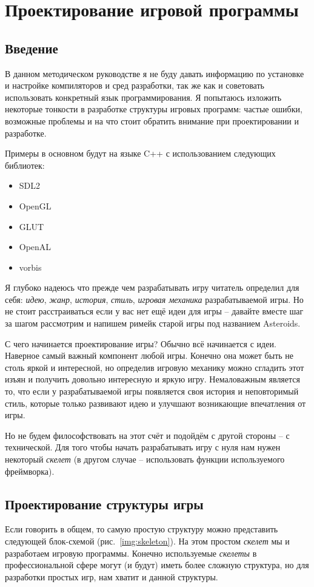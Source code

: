 \chapter{Проектирование игровой программы}
\section{Введение}

В данном методическом руководстве я не буду давать информацию по установке и настройке компиляторов и сред 
разработки, так же как и советовать использовать конкретный язык программирования. Я попытаюсь изложить 
некоторые тонкости в разработке структуры игровых программ: частые ошибки, возможные проблемы и на что стоит 
обратить внимание при проектировании и разработке.

Примеры в основном будут на языке C++ с использованием следующих библиотек:
\begin{itemize}
    \item SDL2
    \item OpenGL
    \item GLUT
    \item OpenAL
    \item vorbis
\end{itemize}

Я глубоко надеюсь что прежде чем разрабатывать игру читатель определил для себя: \emph{идею}, \emph{жанр}, 
\emph{история}, \emph{стиль}, \emph{игровая механика} разрабатываемой игры. Но не стоит расстраиваться если 
у вас нет ещё идеи для игры -- давайте вместе шаг за шагом рассмотрим и напишем римейк старой игры под 
названием Asteroids.

С чего начинается проектирование игры? Обычно всё начинается с идеи. Наверное самый важный компонент любой 
игры. Конечно она может быть не столь яркой и интересной, но определив игровую механику можно сгладить этот 
изъян и получить довольно интересную и яркую игру. Немаловажным является то, что если у разрабатываемой игры 
появляется своя история и неповторимый стиль, которые только развивают идею и улучшают возникающие 
впечатления от игры.

Но не будем философствовать на этот счёт и подойдём с другой стороны -- с технической. Для того чтобы начать
разрабатывать игру с нуля нам нужен некоторый \emph{скелет} (в другом случае -- использовать функции 
используемого фреймворка).

\pagebreak

\section{Проектирование структуры игры}
Если говорить в общем, то самую простую структуру можно представить следующей блок-схемой 
(рис.~\ref{img:skeleton}). На этом простом \emph{скелет} мы и разработаем игровую программы. Конечно 
используемые \emph{скелеты} в профессиональной сфере могут (и будут) иметь более сложную структура, но для 
разработки простых игр, нам хватит и данной структуры.

